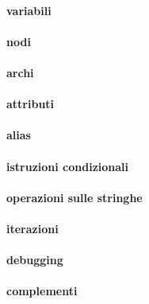 \paragraph{variabili}

\paragraph{nodi}

\paragraph{archi}

\paragraph{attributi}

\paragraph{alias}

\paragraph{istruzioni condizionali}

\paragraph{operazioni sulle stringhe}

\paragraph{iterazioni}

\paragraph{debugging}

\paragraph{complementi}

